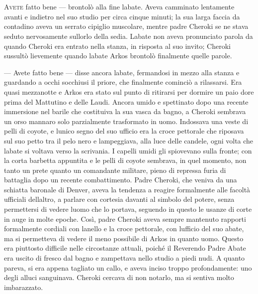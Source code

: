 	\chapter{\phantom{title}}

\lettrine{A}{vete} fatto bene --- brontolò alla fine l\textquotesingle abate.
Aveva camminato lentamente avanti e indietro nel suo studio per circa
cinque minuti; la sua larga faccia da contadino aveva un serrato
cipiglio muscolare, mentre padre Cheroki se ne stava seduto nervosamente
sull\textquotesingle orlo della sedia. L\textquotesingle abate non aveva
pronunciato parola da quando Cheroki era entrato nella stanza, in
risposta al suo invito; Cheroki sussultò lievemente quando
l\textquotesingle abate Arkos brontolò finalmente quelle parole.

--- Avete fatto bene --- disse ancora l\textquotesingle abate,
fermandosi in mezzo alla stanza e guardando a occhi socchiusi il priore,
che finalmente cominciò a rilassarsi. Era quasi mezzanotte e Arkos era
stato sul punto di ritirarsi per dormire un paio d\textquotesingle ore
prima del Mattutino e delle Laudi. Ancora umido e spettinato dopo una
recente immersione nel barile che costituiva la sua vasca da bagno, a
Cheroki sembrava un orso mannaro solo parzialmente trasformato in uomo.
Indossava una veste di pelli di coyote, e l\textquotesingle unico segno
del suo ufficio era la croce pettorale che riposava sul suo petto tra il
pelo nero e lampeggiava, alla luce delle candele, ogni volta che
l\textquotesingle abate si voltava verso la scrivania. I capelli umidi
gli spiovevano sulla fronte; con la corta barbetta appuntita e le pelli
di coyote sembrava, in quel momento, non tanto un prete quanto un
comandante militare, pieno di repressa furia di battaglia dopo un
recente combattimento. Padre Cheroki, che veniva da una schiatta
baronale di Denver, aveva la tendenza a reagire formalmente alle facoltà
ufficiali dell\textquotesingle altro, a parlare con cortesia davanti al
simbolo del potere, senza permettersi di vedere l\textquotesingle uomo
che lo portava, seguendo in questo le usanze di corte in auge in molte
epoche. Così, padre Cheroki aveva sempre mantenuto rapporti formalmente
cordiali con l\textquotesingle anello e la croce pettorale, con
l\textquotesingle ufficio del suo abate, ma si permetteva di vedere il
meno possibile di Arkos in quanto uomo. Questo era piuttosto difficile
nelle circostanze attuali, poiché il Reverendo Padre Abate era uscito di
fresco dal bagno e zampettava nello studio a piedi nudi. A quanto
pareva, si era appena tagliato un callo, e aveva inciso troppo
profondamente: uno degli alluci sanguinava. Cheroki cercava di non
notarlo, ma si sentiva molto imbarazzato.

